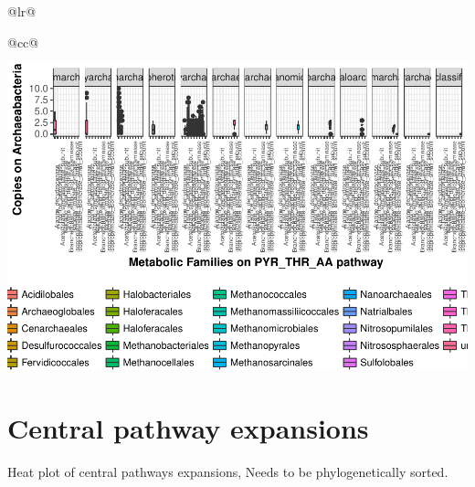 \documentclass[12pt,twoside]{reedthesis}
\begin{document}
\begin{longtable}[c]{@{}lr@{}}
\begin{longtable}[c]{@{}cc@{}}
  \begin{center}\includegraphics{tesis_files/figure-latex/ArcheaeBoxPlotByPhylum-10} \end{center}
  
  \begin{Shaded}
  \begin{Highlighting}[]
  
  \end{Highlighting}
  \end{Shaded}
  
  \clearpage 
  
  \section{Central pathway expansions}\label{central-pathway-expansions}
  
  Heat plot of central pathways expansions, Needs to be phylogenetically
  sorted.
  

\end{longtable}
\end{longtable}
\end{document}
